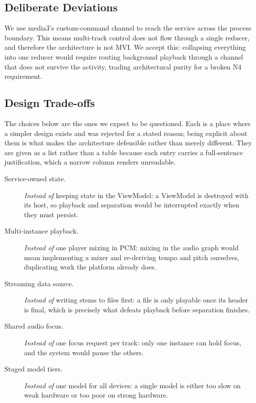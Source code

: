 \documentclass[letterpaper]{article} %
\begin{document}
\subsection{Deliberate Deviations}

We use media3's custom-command channel to reach the service across the process
boundary. This means multi-track control does not flow through a single
reducer, and therefore the architecture is not MVI. We accept this: collapsing
everything into one reducer would require routing background playback through
a channel that does not survive the activity, trading architectural purity for
a broken N4 requirement.

\subsection{Design Trade-offs}

The choices below are the ones we expect to be questioned. Each is a place
where a simpler design exists and was rejected for a stated reason; being
explicit about them is what makes the architecture defensible rather than
merely different. They are given as a list rather than a table because each
entry carries a full-sentence justification, which a narrow column renders
unreadable.

\begin{description}
\item[Service-owned state.] \emph{Instead of} keeping state in the ViewModel:
  a ViewModel is destroyed with its host, so playback and separation would be
  interrupted exactly when they must persist.

\item[Multi-instance playback.] \emph{Instead of} one player mixing in PCM:
  mixing in the audio graph would mean implementing a mixer and re-deriving
  tempo and pitch ourselves, duplicating work the platform already does.

\item[Streaming data source.] \emph{Instead of} writing stems to files first:
  a file is only playable once its header is final, which is precisely what
  defeats playback before separation finishes.

\item[Shared audio focus.] \emph{Instead of} one focus request per track: only
  one instance can hold focus, and the system would pause the others.

\item[Staged model tiers.] \emph{Instead of} one model for all devices: a
  single model is either too slow on weak hardware or too poor on strong
  hardware.
\end{description}
\end{document}
